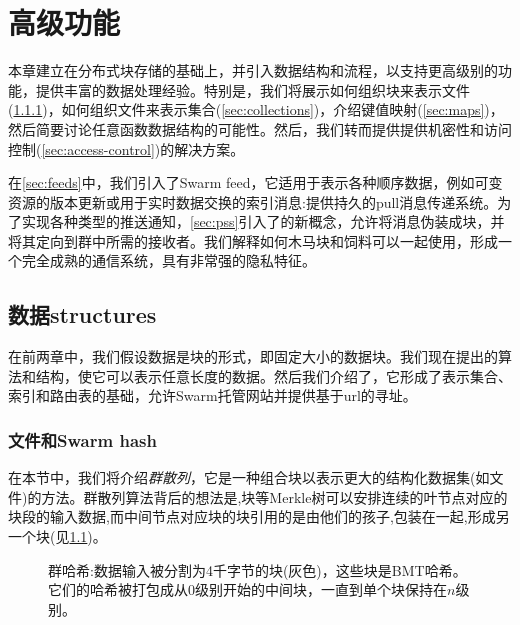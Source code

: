 \chapter{高级功能}\label{sec:high-level-functionality}


本章建立在分布式块存储的基础上，并引入数据结构和流程，以支持更高级别的功能，提供丰富的数据处理经验。特别是，我们将展示如何组织块来表示文件(\ref{sec:files})，如何组织文件来表示集合(\ref{sec:collections})，介绍键值映射(\ref{sec:maps})，然后简要讨论任意函数数据结构的可能性。然后，我们转而提供提供机密性和访问控制(\ref{sec:access-control})的解决方案。

在\ref{sec:feeds}中，我们引入了Swarm feed，它适用于表示各种顺序数据，例如可变资源的版本更新或用于实时数据交换的索引消息:提供持久的pull消息传递系统。为了实现各种类型的推送通知，\ref{sec:pss}引入了的新概念，允许将消息伪装成块，并将其定向到群中所需的接收者。我们解释如何木马块和饲料可以一起使用，形成一个完全成熟的通信系统，具有非常强的隐私特征。                                                       

\section{数据structures\statusgreen}\label{sec:datastructures}

\green{}

在前两章中，我们假设数据是块的形式，即固定大小的数据块。我们现在提出的算法和结构，使它可以表示任意长度的数据。然后我们介绍了，它形成了表示集合、索引和路由表的基础，允许Swarm托管网站并提供基于url的寻址。

\subsection{文件和Swarm hash\statusgreen}\label{sec:files}

在本节中，我们将介绍\emph{群散列}，它是一种组合块以表示更大的结构化数据集(如文件)的方法。群散列算法背后的想法是,块等Merkle树可以安排连续的叶节点对应的块段的输入数据,而中间节点对应块的块引用的是由他们的孩子,包装在一起,形成另一个块(见\ref{fig:Swarm-hash})。 



\begin{figure}[htbp]
\centering
\resizebox{1\textwidth}{!}{
    
}
\caption[群散列\statusgreen]{群哈希:数据输入被分割为4千字节的块(灰色)，这些块是BMT哈希。它们的哈希被打包成从$0$级别开始的中间块，一直到单个块保持在$n$级别。 }
\label{fig:Swarm-hash}
\end{figure}

